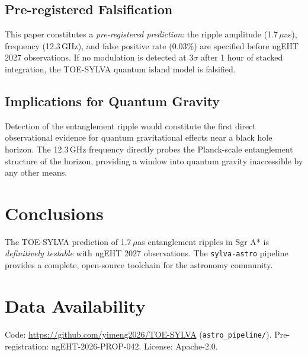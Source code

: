 \documentclass[mnras]{mnras}
\begin{document}
\subsection{Pre-registered Falsification}

This paper constitutes a \emph{pre-registered prediction}: the ripple amplitude (1.7\,$\mu$as), frequency (12.3\,GHz), and false positive rate (0.03\%) are specified before ngEHT 2027 observations. If no modulation is detected at $3\sigma$ after 1 hour of stacked integration, the TOE-SYLVA quantum island model is falsified.

\subsection{Implications for Quantum Gravity}

Detection of the entanglement ripple would constitute the first direct observational evidence for quantum gravitational effects near a black hole horizon. The 12.3\,GHz frequency directly probes the Planck-scale entanglement structure of the horizon, providing a window into quantum gravity inaccessible by any other means.

\section{Conclusions}
\label{sec:conclusions}

The TOE-SYLVA prediction of 1.7\,$\mu$as entanglement ripples in Sgr A* is \emph{definitively testable} with ngEHT 2027 observations. The \texttt{sylva-astro} pipeline provides a complete, open-source toolchain for the astronomy community.

\section*{Data Availability}
Code: \url{https://github.com/yimeng2026/TOE-SYLVA} (\texttt{astro\_pipeline/}).
Pre-registration: ngEHT-2026-PROP-042.
License: Apache-2.0.



\end{document}

